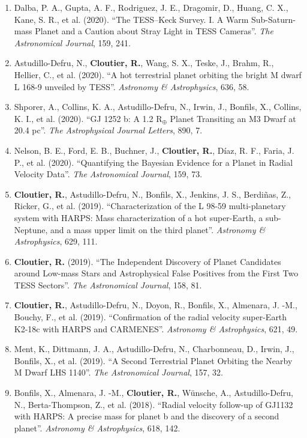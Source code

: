 \documentclass[12pt]{article}
\begin{document}
\begin{itemize}
\begin{enumerate}
{\bf Cloutier, R.}, \& Menou, K. (2020). ``Evolution of the Radius Valley around Low-mass Stars from Kepler and K2''. {\it The Astronomical Journal}, 159, 211.
\item Dalba, P. A., Gupta, A. F., Rodriguez, J. E., Dragomir, D., Huang, C. X., Kane, S. R., et al. (2020). ``The TESS–Keck Survey. I. A Warm Sub-Saturn-mass Planet and a Caution about Stray Light in TESS Cameras''. {\it The Astronomical Journal}, 159, 241.
\item Astudillo-Defru, N., {\bf Cloutier, R.}, Wang, S. X., Teske, J., Brahm, R., Hellier, C., et al. (2020). ``A hot terrestrial planet orbiting the bright M dwarf L 168-9 unveiled by TESS''. {\it Astronomy \& Astrophysics}, 636, 58.
\item Shporer, A., Collins, K. A., Astudillo-Defru, N., Irwin, J., Bonfils, X., Collins, K. I., et al. (2020). ``GJ 1252 b: A 1.2 R$_{\oplus}$ Planet Transiting an M3 Dwarf at 20.4 pc''. {\it The Astrophysical Journal Letters}, 890, 7.
\item Nelson, B. E., Ford, E. B., Buchner, J., {\bf Cloutier, R.}, Díaz, R. F., Faria, J. P., et al. (2020). ``Quantifying the Bayesian Evidence for a Planet in Radial Velocity Data''. {\it The Astronomical Journal}, 159, 73.
\item {\bf Cloutier, R.}, Astudillo-Defru, N., Bonfils, X., Jenkins, J. S., Berdiñas, Z., Ricker, G., et al. (2019). ``Characterization of the L 98-59 multi-planetary system with HARPS: Mass characterization of a hot super-Earth, a sub-Neptune, and a mass upper limit on the third planet''. {\it Astronomy \& Astrophysics}, 629, 111.
\item {\bf Cloutier, R.} (2019). ``The Independent Discovery of Planet Candidates around Low-mass Stars and Astrophysical False Positives from the First Two TESS Sectors''. {\it The Astronomical Journal}, 158, 81.
\item {\bf Cloutier, R.}, Astudillo-Defru, N., Doyon, R., Bonfils, X., Almenara, J. -M., Bouchy, F., et al. (2019). ``Confirmation of the radial velocity super-Earth K2-18c with HARPS and CARMENES''. {\it Astronomy \& Astrophysics}, 621, 49.
\item Ment, K., Dittmann, J. A., Astudillo-Defru, N., Charbonneau, D., Irwin, J., Bonfils, X., et al. (2019). ``A Second Terrestrial Planet Orbiting the Nearby M Dwarf LHS 1140''. {\it The Astronomical Journal}, 157, 32.
\item Bonfils, X., Almenara, J. -M., {\bf Cloutier, R.}, Wünsche, A., Astudillo-Defru, N., Berta-Thompson, Z., et al. (2018). ``Radial velocity follow-up of GJ1132 with HARPS: A precise mass for planet b and the discovery of a second planet''. {\it Astronomy \& Astrophysics}, 618, 142.

\end{enumerate}
\end{itemize}
\end{document}
